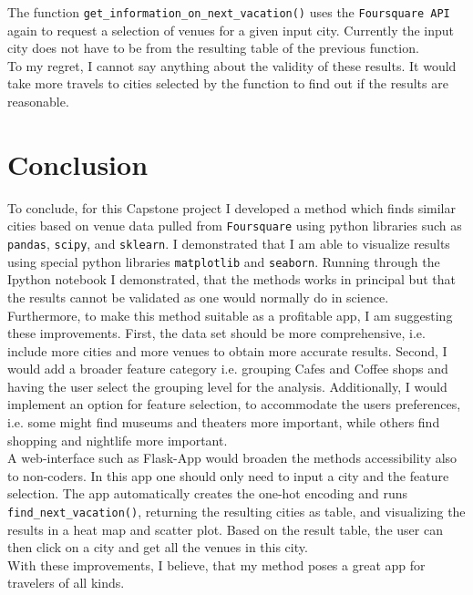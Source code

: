 \documentclass[11pt,a4paper,final]{article}
\begin{document}
The function \texttt{get\_information\_on\_next\_vacation()} uses the \texttt{Foursquare API} again to request a selection of venues for a given input city. Currently the input city does not have to be from the resulting table of the previous function.\\
To my regret, I cannot say anything about the validity of these results. It would take more travels to cities selected by the function to find out if the results are reasonable. 


\section{Conclusion}
To conclude, for this Capstone project I developed a method which finds similar cities based on venue data pulled from \texttt{Foursquare} using python libraries such as \texttt{pandas}, \texttt{scipy}, and  \texttt{sklearn}. I demonstrated that I am able to visualize results using special python libraries \texttt{matplotlib} and \texttt{seaborn}. Running through the Ipython notebook I demonstrated, that the methods works in principal but that the results cannot be validated as one would normally do in science.\\
Furthermore, to make this method suitable as a profitable app, I am suggesting these improvements. First, the data set should be more comprehensive, i.e. include more cities and more venues to obtain more accurate results. Second, I would add a broader feature category i.e. grouping Cafes and Coffee shops and having the user select the grouping level for the analysis. Additionally, I would implement an option for feature selection, to accommodate the users preferences, i.e. some might find museums and theaters more important, while others find shopping and nightlife more important.\\
A web-interface such as Flask-App would broaden the methods accessibility also to non-coders. In this app one should only need to input a city and the feature selection. The app automatically creates the one-hot encoding and runs \texttt{find\_next\_vacation()}, returning the resulting cities as table, and visualizing the results in a heat map and scatter plot. Based on the result table, the user can then click on a city and get all the venues in this city.\\
With these improvements, I believe, that my method poses a great app for travelers of all kinds.
\end{document}

